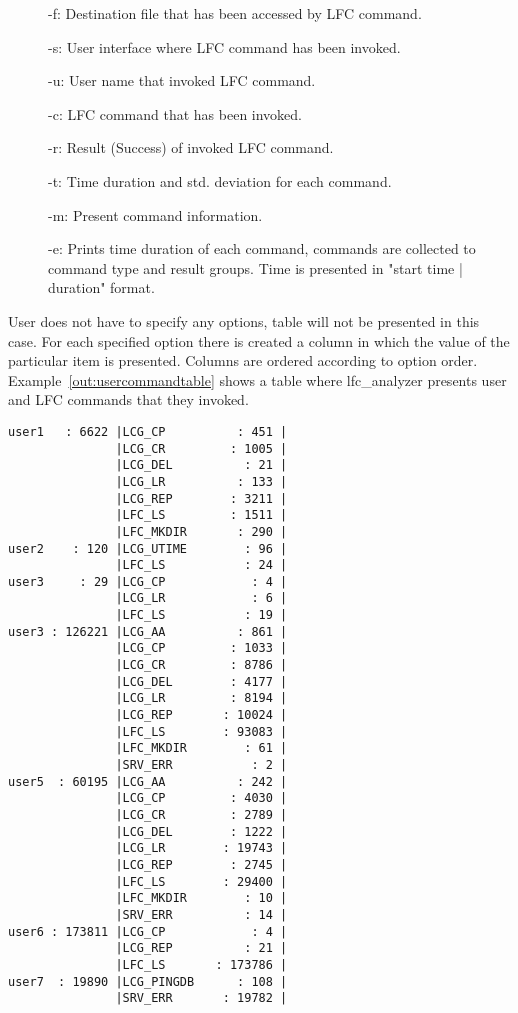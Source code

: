 \documentclass[a4paper, 11pt]{article} %
\begin{document}
\begin{description}
    \item[] -f: Destination file that has been accessed by LFC command.
    \item[] -s: User interface where LFC command has been invoked. 
    \item[] -u: User name that invoked LFC command.
    \item[] -c: LFC command that has been invoked.
    \item[] -r: Result (Success) of invoked LFC command.
    \item[] -t: Time duration and std. deviation for each command.
    \item[] -m: Present command information.
    \item[] -e: Prints time duration of each command, commands are collected to command type and result groups.
Time is presented in "start time | duration" format.
\end{description}

User does not have to specify any options, table will not be presented in this case. For each specified option there is created a column in which the value of the particular item is presented. Columns are ordered according to option order. Example~\ref{out:usercommandtable} shows a table where lfc\_analyzer presents user and LFC commands that they invoked.

\newpage

\begin{center}
\begin{lstlisting}[style=cli, label={out:usercommandtable}, caption={lfc\_analyzer -i logfile -u -c}]
user1   : 6622 |LCG_CP          : 451 |
               |LCG_CR         : 1005 |
               |LCG_DEL          : 21 |
               |LCG_LR          : 133 |
               |LCG_REP        : 3211 |
               |LFC_LS         : 1511 |
               |LFC_MKDIR       : 290 |
user2    : 120 |LCG_UTIME        : 96 |
               |LFC_LS           : 24 |
user3     : 29 |LCG_CP            : 4 |
               |LCG_LR            : 6 |
               |LFC_LS           : 19 |
user3 : 126221 |LCG_AA          : 861 |
               |LCG_CP         : 1033 |
               |LCG_CR         : 8786 |
               |LCG_DEL        : 4177 |
               |LCG_LR         : 8194 |
               |LCG_REP       : 10024 |
               |LFC_LS        : 93083 |
               |LFC_MKDIR        : 61 |
               |SRV_ERR           : 2 |
user5  : 60195 |LCG_AA          : 242 |
               |LCG_CP         : 4030 |
               |LCG_CR         : 2789 |
               |LCG_DEL        : 1222 |
               |LCG_LR        : 19743 |
               |LCG_REP        : 2745 |
               |LFC_LS        : 29400 |
               |LFC_MKDIR        : 10 |
               |SRV_ERR          : 14 |
user6 : 173811 |LCG_CP            : 4 |
               |LCG_REP          : 21 |
               |LFC_LS       : 173786 |
user7  : 19890 |LCG_PINGDB      : 108 |
               |SRV_ERR       : 19782 |
\end{lstlisting}
\end{center}
\end{document}
